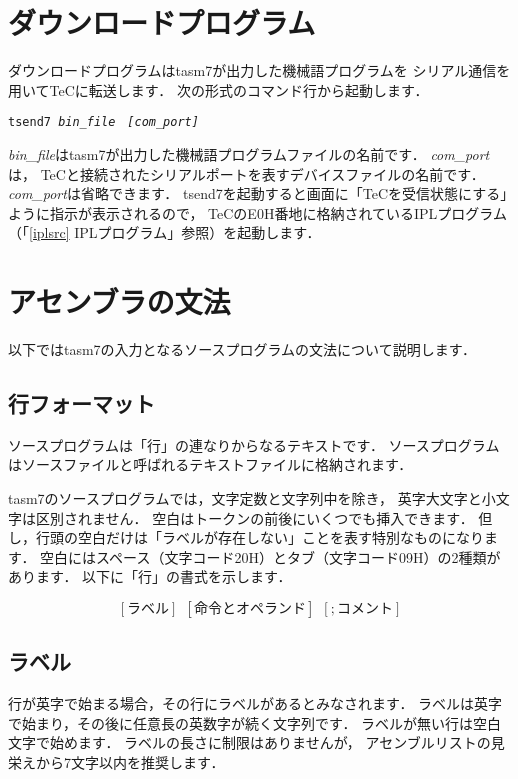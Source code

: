 \section{ダウンロードプログラム}
ダウンロードプログラムはtasm7が出力した機械語プログラムを
シリアル通信を用いてTeCに転送します．
次の形式のコマンド行から起動します．

\begin{center}
{\small\tt tsend7  {\it bin\_file}　{\it [com\_port]}} \\
\end{center}

{\it bin\_file}はtasm7が出力した機械語プログラムファイルの名前です．
{\it com\_port}は，
TeCと接続されたシリアルポートを表すデバイスファイルの名前です．
{\it com\_port}は省略できます．
tsend7を起動すると画面に「TeCを受信状態にする」ように指示が表示されるので，
TeCのE0H番地に格納されているIPLプログラム
（「\ref{iplsrc} IPLプログラム」参照）を起動します．

\section{アセンブラの文法}
\label{syn}
以下ではtasm7の入力となるソースプログラムの文法について説明します．

\subsection{行フォーマット}
ソースプログラムは「行」の連なりからなるテキストです．
ソースプログラムはソースファイルと呼ばれるテキストファイルに格納されます．

tasm7のソースプログラムでは，文字定数と文字列中を除き，
英字大文字と小文字は区別されません．
空白はトークンの前後にいくつでも挿入できます．
但し，行頭の空白だけは「ラベルが存在しない」ことを表す特別なものになります．
空白にはスペース（文字コード20H）とタブ（文字コード09H）の2種類があります．
以下に「行」の書式を示します．

{\small\[ [ラベル]~~[命令とオペランド]~~[ ; コメント] \]}

\subsection{ラベル}
行が英字で始まる場合，その行にラベルがあるとみなされます．
ラベルは英字で始まり，その後に任意長の英数字が続く文字列です．
ラベルが無い行は空白文字で始めます．
ラベルの長さに制限はありませんが，
アセンブルリストの見栄えから7文字以内を推奨します．

